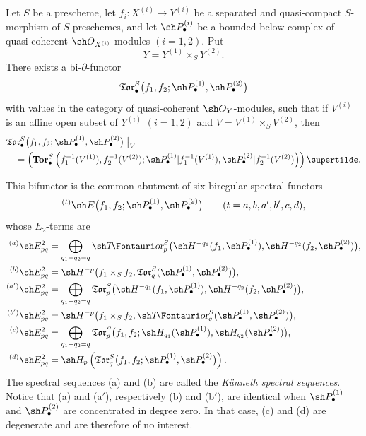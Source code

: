 \begin{theorem}[6.7.3]
\label{III.6.7.3}
Let $S$ be a prescheme, let
$f_i:X^{(i)}\to Y^{(i)}$ be a separated and quasi-compact
$S$-morphism of $S$-preschemes, and let
$\sh P_\bullet^{(i)}$ be a bounded-below complex of
quasi-coherent $\sh O_{X^{(i)}}$-modules $(i=1,2)$.  Put
\[
  Y=Y^{(1)}\times_SY^{(2)}.
\]
There exists a bi-$\partial$-functor
\[
  \mathfrak{Tor}_\bullet^S
  \bigl(
    f_1,f_2;
    \sh P_\bullet^{(1)},\sh P_\bullet^{(2)}
  \bigr)
\]
with values in the category of quasi-coherent
$\sh O_Y$-modules, such that if $V^{(i)}$ is an affine open
subset of $Y^{(i)}$ $(i=1,2)$ and
$V=V^{(1)}\times_SV^{(2)}$, then
\[
\begin{split}
  &\mathfrak{Tor}_\bullet^S
  \bigl(
    f_1,f_2;
    \sh P_\bullet^{(1)},\sh P_\bullet^{(2)}
  \bigr)\bigm|_V\\
  &\quad=
  \left(
    \mathbf{Tor}_\bullet^S
    \left(
      f_1^{-1}(V^{(1)}),f_2^{-1}(V^{(2)});
      \sh P_\bullet^{(1)}|f_1^{-1}(V^{(1)}),
      \sh P_\bullet^{(2)}|f_2^{-1}(V^{(2)})
    \right)
  \right)\supertilde .
\end{split}
\]


This bifunctor is the common abutment of six biregular spectral
functors
\[
  {}^{(t)}\sh E
  \bigl(
    f_1,f_2;
    \sh P_\bullet^{(1)},\sh P_\bullet^{(2)}
  \bigr)
  \qquad(t=a,b,a',b',c,d),
\]
whose $E_2$-terms are
\[
\begin{aligned}
  {}^{(a)}\sh E_{pq}^2
  &=
  \bigoplus_{q_1+q_2=q}
  \shTor_p^S
  \bigl(
    \sh H^{-q_1}(f_1,\sh P_\bullet^{(1)}),
    \sh H^{-q_2}(f_2,\sh P_\bullet^{(2)})
  \bigr),\\
  {}^{(b)}\sh E_{pq}^2
  &=
  \sh H^{-p}
  \bigl(
    f_1\times_Sf_2,
    \mathfrak{Tor}_q^S
    (\sh P_\bullet^{(1)},\sh P_\bullet^{(2)})
  \bigr),\\
  {}^{(a')}\sh E_{pq}^2
  &=
  \bigoplus_{q_1+q_2=q}
  \mathfrak{Tor}_p^S
  \bigl(
    \sh H^{-q_1}(f_1,\sh P_\bullet^{(1)}),
    \sh H^{-q_2}(f_2,\sh P_\bullet^{(2)})
  \bigr),\\
  {}^{(b')}\sh E_{pq}^2
  &=
  \sh H^{-p}
  \bigl(
    f_1\times_Sf_2,
    \shTor_q^S
    (\sh P_\bullet^{(1)},\sh P_\bullet^{(2)})
  \bigr),\\
  {}^{(c)}\sh E_{pq}^2
  &=
  \bigoplus_{q_1+q_2=q}
  \mathfrak{Tor}_p^S
  \bigl(
    f_1,f_2;
    \sh H_{q_1}(\sh P_\bullet^{(1)}),
    \sh H_{q_2}(\sh P_\bullet^{(2)})
  \bigr),\\
  {}^{(d)}\sh E_{pq}^2
  &=
  \sh H_p
  \left(
    \mathfrak{Tor}_q^S
    \bigl(
      f_1,f_2;
      \sh P_\bullet^{(1)},\sh P_\bullet^{(2)}
    \bigr)
  \right).
\end{aligned}
\]
The spectral sequences \textnormal{(a)} and \textnormal{(b)} are
called the \emph{K\"unneth spectral sequences}.  Notice that
\textnormal{(a)} and \textnormal{(a$'$)}, respectively
\textnormal{(b)} and \textnormal{(b$'$)}, are identical when
$\sh P_\bullet^{(1)}$ and $\sh P_\bullet^{(2)}$ are concentrated
in degree zero.  In that case, \textnormal{(c)} and
\textnormal{(d)} are degenerate and are therefore of no
interest.
\end{theorem}

